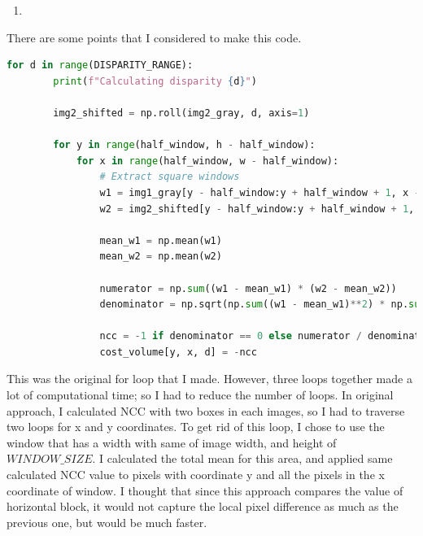 \begin{enumerate}
    \item 
\end{enumerate}

There are some points that I considered to make this code.
\begin{lstlisting}[language=python]
    for d in range(DISPARITY_RANGE):
        print(f"Calculating disparity {d}")

        img2_shifted = np.roll(img2_gray, d, axis=1)

        for y in range(half_window, h - half_window):
            for x in range(half_window, w - half_window):
                # Extract square windows
                w1 = img1_gray[y - half_window:y + half_window + 1, x - half_window:x + half_window + 1]
                w2 = img2_shifted[y - half_window:y + half_window + 1, x - half_window:x + half_window + 1]
                
                mean_w1 = np.mean(w1)
                mean_w2 = np.mean(w2)
                
                numerator = np.sum((w1 - mean_w1) * (w2 - mean_w2))
                denominator = np.sqrt(np.sum((w1 - mean_w1)**2) * np.sum((w2 - mean_w2)**2))

                ncc = -1 if denominator == 0 else numerator / denominator
                cost_volume[y, x, d] = -ncc
\end{lstlisting}

This was the original for loop that I made. However, three loops together made a lot of computational time; so I had to reduce the number of loops.
In original approach, I calculated NCC with two boxes in each images, so I had to traverse two loops for x and y coordinates. To get rid of this loop, I chose to use the window that has a width with same of image width, and height of $WINDOW\_SIZE$. I calculated the total mean for this area, and applied same calculated NCC value to pixels with coordinate y and all the pixels in the x coordinate of window.
I thought that since this approach compares the value of horizontal block, it would not capture the local pixel difference as much as the previous one, but would be much faster.

